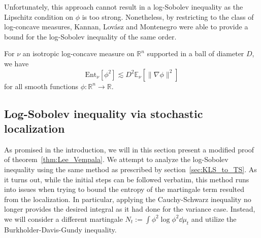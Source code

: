 Unfortunately, this approach cannot result in a log-Sobolev inequality as the Lipschitz condition on \(\phi\) is 
too strong. Nonetheless, by restricting to the class of log-concave measures, Kannan, Lovász and Montenegro 
\cite{Lovasz_2007} were able to provide a bound for the log-Sobolev inequality of the same order.

\begin{lemma}\label{lem:entropy_supp}
  For \(\nu\) an isotropic log-concave measure on \(\mathbb{R}^n\) supported in a ball of diameter \(D\), 
  we have
  \[\text{Ent}_\nu[\phi^2] \lesssim D^2 \mathbb{E}_\nu[\|\nabla \phi\|^2]\]
  for all smooth functions \(\phi : \mathbb{R}^n \to \mathbb{R}\).
\end{lemma}

\subsection{Log-Sobolev inequality via stochastic localization}

As promised in the introduction, we will in this section present a modified proof of theorem~\ref{thm:Lee_Vempala}.
We attempt to analyze the log-Sobolev inequality using the same method as prescribed by section~\ref{sec:KLS_to_TS}. 
As it turns out, while the initial steps can be followed verbatim, this method runs into issues when trying to 
bound the entropy of the martingale term resulted from the localization. In particular, applying the Cauchy-Schwarz 
inequality no longer provides the desired integral as it had done for the variance case. Instead, we will consider 
a different martingale \(N_t := \int \phi^2 \log \phi^2 \dd \mu_t\) and utilize the Burkholder-Davis-Gundy inequality.


